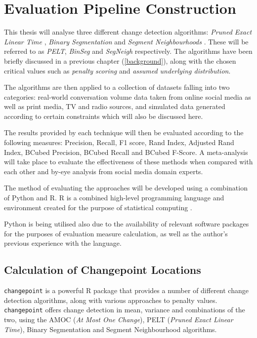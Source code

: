 \documentclass[../main.tex]{subfiles}
\begin{document}
\section{Evaluation Pipeline Construction}

This thesis will analyse three different change detection algorithms: \emph{Pruned Exact Linear Time} \cite{Killick2011a}, \emph{Binary Segmentation} \cite{Jackson2003} and \emph{Segment Neighbourhoods} \cite{Auger1989}. These will be referred to as \emph{PELT}, \emph{BinSeg} and \emph{SegNeigh} respectively. The algorithms have been briefly discussed in a previous chapter (\autoref{background}), along with the chosen critical values such as \emph{penalty scoring} and \emph{assumed underlying distribution}.

The algorithms are then applied to a collection of datasets falling into two categories: real-world conversation volume data taken from online social media as well as print media, TV and radio sources, and simulated data generated according to certain constraints which will also be discussed here.

The results provided by each technique will then be evaluated according to the following measures: Precision, Recall, F1 score, Rand Index, Adjusted Rand Index, BCubed Precision, BCubed Recall and BCubed F-Score. A meta-analysis will take place to evaluate the effectiveness of these methods when compared with each other and by-eye analysis from social media domain experts.

The method of evaluating the approaches will be developed using a combination of Python and \textsf{R}. \textsf{R} is a combined high-level programming language and environment created for the purpose of statistical computing \cite{RCoreTeam2017}.

Python is being utilised also due to the availability of relevant software packages for the purposes of evaluation measure calculation, as well as the author's previous experience with the language.

\subsection{Calculation of Changepoint Locations}

\texttt{changepoint} is a powerful R package that provides a number of different change detection algorithms, along with various approaches to penalty values. \texttt{changepoint} offers change detection in mean, variance and combinations of the two, using the AMOC (\emph{At Most One Change}), PELT (\emph{Pruned Exact Linear Time}), Binary Segmentation and Segment Neighbourhood algorithms.
\end{document}
